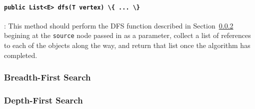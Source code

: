 \documentclass[a4paper]{article}
\begin{document}
\paragraph{\lstinline|public List<E> dfs(T vertex) \{ ... \}|}: This method 
should perform the DFS function described in Section~\ref{sec:dfs} begining at the
\lstinline|source| node passed in as a parameter, collect a list of references
to each of the objects along the way, and return that list once the algorithm
has completed.




\subsubsection{Breadth-First Search}\label{sec:bfs}


\subsubsection{Depth-First Search}\label{sec:dfs}


\newpage
\end{document}
